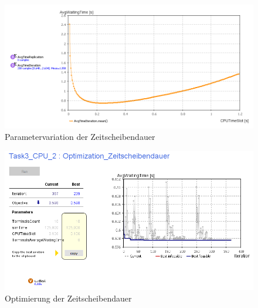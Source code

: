\documentclass[
a4paper,   
headsepline, 
fleqn,     
11pt
]{scrartcl}
\begin{document}
\begin{figure}[h]
  \centering
  \includegraphics[width=1\textwidth]{./images/ParameterVariationCPUTimeSlot_StopTime4000}
  \caption{Parametervariation der Zeitscheibendauer}
  \label{fig:ParametervariationB-02}
\end{figure}

\begin{figure}[h]
  \centering
  \includegraphics[width=1\textwidth]{./images/Optimization}
  \caption{Optimierung der Zeitscheibendauer}
  \label{fig:OptimizationC}
\end{figure}

\appendix  


\end{document}
